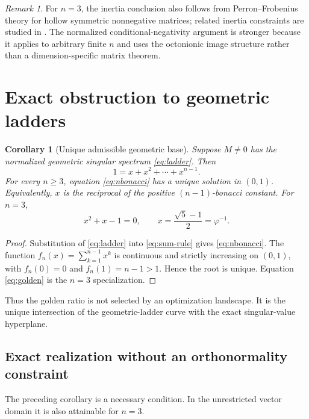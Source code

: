 \documentclass[11pt]{article}
\newtheorem{corollary}[theorem]{Corollary}
\theoremstyle{remark}
\newtheorem{remark}[theorem]{Remark}
\begin{document}
\begin{remark}
For $n=3$, the inertia conclusion also follows from Perron--Frobenius theory
for hollow symmetric nonnegative matrices; related inertia constraints are
studied in \cite{CharlesEtAl2013}.  The normalized conditional-negativity
argument is stronger because it applies to arbitrary finite $n$ and uses the
octonionic image structure rather than a dimension-specific matrix theorem.
\end{remark}

\section{Exact obstruction to geometric ladders}

\begin{corollary}[Unique admissible geometric base]
Suppose $M\ne0$ has the normalized geometric singular spectrum \eqref{eq:ladder}.  Then
\begin{equation}
 1=x+x^2+\cdots+x^{n-1}.
 \label{eq:nbonacci}
\end{equation}
For every $n\ge3$, equation \eqref{eq:nbonacci} has a unique solution in $(0,1)$.  Equivalently, $x$ is the reciprocal of the positive $(n-1)$-bonacci constant.  For $n=3$,
\begin{equation}
 x^2+x-1=0,
 \qquad
 x=\frac{\sqrt5-1}{2}=\varphi^{-1}.
 \label{eq:golden}
\end{equation}
\end{corollary}

\begin{proof}
Substitution of \eqref{eq:ladder} into \eqref{eq:sum-rule} gives \eqref{eq:nbonacci}.  The function $f_n(x)=\sum_{k=1}^{n-1}x^k$ is continuous and strictly increasing on $(0,1)$, with $f_n(0)=0$ and $f_n(1)=n-1>1$.  Hence the root is unique.  Equation \eqref{eq:golden} is the $n=3$ specialization.
\end{proof}

Thus the golden ratio is not selected by an optimization landscape.  It is the unique intersection of the geometric-ladder curve with the exact singular-value hyperplane.

\subsection{Exact realization without an orthonormality constraint}

The preceding corollary is a necessary condition.  In the unrestricted vector domain it is also attainable for $n=3$.
\end{document}
